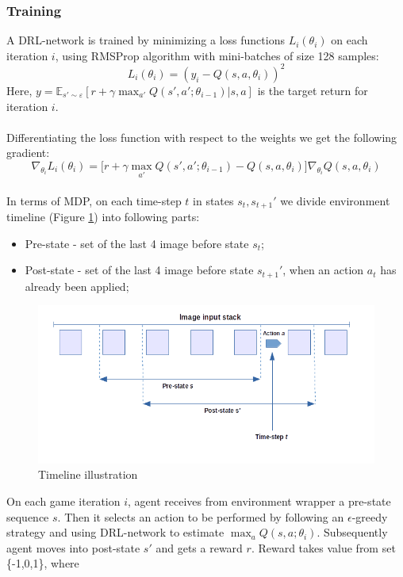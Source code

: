 \documentclass[a4paper,oneside,dvipsnames]{article}
\begin{document}
\subsubsection[Training]{Training}
A DRL-network is trained by minimizing a loss functions $L_i (\theta_i)$ on each iteration $i$, using RMSProp algorithm with mini-batches of size 128 samples:
\begin{equation} \label{eq:activation}
    L_i(\theta_i) = (y_i - Q(s,a,\theta_i))^2
\end{equation}
Here, $y = \mathbb{E}_{s'\sim \varepsilon}[r + \gamma \max_{a'} Q(s', a';\theta_{i-1})|s,a]$ is the target return for iteration $i$.\\
\\
Differentiating the loss function with respect to the weights we get the following gradient:
\begin{equation} \label{eq:activation}
    \nabla_{\theta_i} L_i(\theta_i) = \Big[r + \gamma \max_{a'} Q(s', a';\theta_{i-1}) - Q(s,a,\theta_i)\Big]\nabla_{\theta_i} Q(s,a,\theta_i)
\end{equation}
\\
In terms of MDP, on each time-step $t$ in states $s_t,s_{t+1}'$ we divide environment timeline (Figure \ref{fig:states}) into following parts:
\begin{itemize}
    \item Pre-state - set of the last 4 image before state $s_t$;
    \item Post-state - set of the last 4 image before state $s_{t+1}'$, when an action $a_t$ has already been applied;
\end{itemize}
\begin{figure}[H]
    \centering
    \includegraphics[scale=0.50]{states.png}
    \caption{Timeline illustration}
    \label{fig:states}
\end{figure}
On each game iteration $i$, agent receives from environment wrapper a pre-state sequence $s$. Then it selects an action to be performed by following an $\epsilon$-greedy strategy and using DRL-network to estimate $\max_{a} Q(s, a;\theta_i)$. Subsequently agent moves into post-state $s'$ and gets a reward $r$. Reward takes value from set \{-1,0,1\}, where
\end{document}
